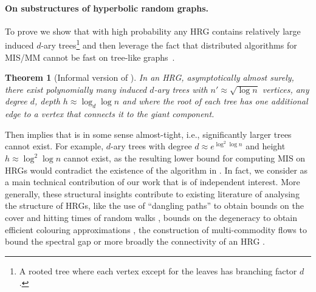 \documentclass[letterpaper,11pt]{article}
\newcommand{\1}{\mathbb I}
\newtheorem*{theorem*}{Theorem}
\newcounter{ctr}
\begin{document}
\paragraph{On substructures of hyperbolic random graphs.} 
To prove  we show that with high probability any HRG contains relatively large induced $d$-ary trees\footnote{A rooted tree where each vertex except for the leaves has branching factor $d$.} and then leverage the fact that distributed algorithms for MIS/MM cannot be fast on tree-like graphs~\cite{kmw-jacm-2016,khoury2025round,Coupette2021,bbhors-jacm-2019,Balliu2026New, bgko-podc-23,BBKO22}.
%
 \begin{theorem*}[Informal version of ]\label{thm:trees}
In an HRG, asymptotically almost surely, there exist polynomially many induced $d$-ary trees with $n' \approx \sqrt{\log n}$ vertices, any degree $d$, depth $h \approx \log_d\log n$ and where the root of each tree has one additional edge to a vertex that connects it to the giant component.
\end{theorem*}
%
Then  implies that  is in some sense almost-tight, i.e., significantly larger trees cannot exist.  For example, $d$-ary trees with degree $d \approx e^{\log^2\log n}$ and height $h \approx \log^2\log n$ cannot exist, as the resulting lower bound for computing MIS on HRGs would contradict the existence of the algorithm in . In fact, we consider  as a main technical contribution of our work that is of independent interest. More generally, these structural insights contribute to existing literature of analysing the structure of HRGs, like the use of ``dangling paths'' to obtain bounds on the cover and hitting times of random walks \cite{Kiwi2024}, bounds on the degeneracy to obtain efficient colouring approximations \cite{bmrs-stacs-25}, the construction of multi-commodity flows to bound the spectral gap \cite{hrg-spectral} or more broadly the connectivity of an HRG \cite{bfm-giant-15, fm-giant-18, km-slcrhg-19, ms-k-19, fk-dhrg-18, DBLP:journals/im/AbdullahFB17}.
%
\end{document}
